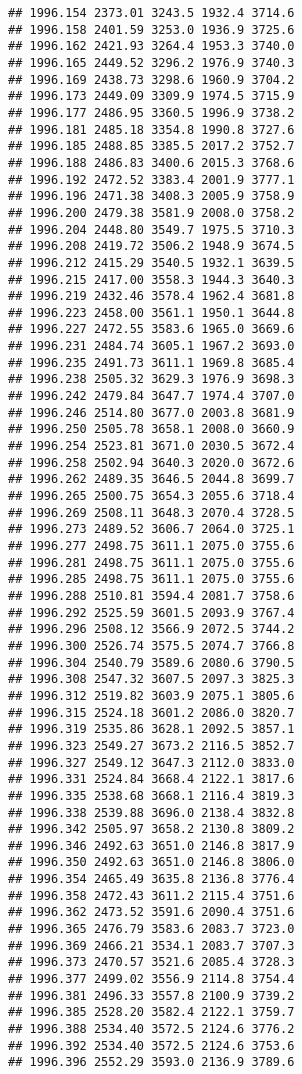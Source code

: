 \documentclass[
]{article}
\begin{document}
\begin{verbatim}
## 1996.154 2373.01 3243.5 1932.4 3714.6
## 1996.158 2401.59 3253.0 1936.9 3725.6
## 1996.162 2421.93 3264.4 1953.3 3740.0
## 1996.165 2449.52 3296.2 1976.9 3740.3
## 1996.169 2438.73 3298.6 1960.9 3704.2
## 1996.173 2449.09 3309.9 1974.5 3715.9
## 1996.177 2486.95 3360.5 1996.9 3738.2
## 1996.181 2485.18 3354.8 1990.8 3727.6
## 1996.185 2488.85 3385.5 2017.2 3752.7
## 1996.188 2486.83 3400.6 2015.3 3768.6
## 1996.192 2472.52 3383.4 2001.9 3777.1
## 1996.196 2471.38 3408.3 2005.9 3758.9
## 1996.200 2479.38 3581.9 2008.0 3758.2
## 1996.204 2448.80 3549.7 1975.5 3710.3
## 1996.208 2419.72 3506.2 1948.9 3674.5
## 1996.212 2415.29 3540.5 1932.1 3639.5
## 1996.215 2417.00 3558.3 1944.3 3640.3
## 1996.219 2432.46 3578.4 1962.4 3681.8
## 1996.223 2458.00 3561.1 1950.1 3644.8
## 1996.227 2472.55 3583.6 1965.0 3669.6
## 1996.231 2484.74 3605.1 1967.2 3693.0
## 1996.235 2491.73 3611.1 1969.8 3685.4
## 1996.238 2505.32 3629.3 1976.9 3698.3
## 1996.242 2479.84 3647.7 1974.4 3707.0
## 1996.246 2514.80 3677.0 2003.8 3681.9
## 1996.250 2505.78 3658.1 2008.0 3660.9
## 1996.254 2523.81 3671.0 2030.5 3672.4
## 1996.258 2502.94 3640.3 2020.0 3672.6
## 1996.262 2489.35 3646.5 2044.8 3699.7
## 1996.265 2500.75 3654.3 2055.6 3718.4
## 1996.269 2508.11 3648.3 2070.4 3728.5
## 1996.273 2489.52 3606.7 2064.0 3725.1
## 1996.277 2498.75 3611.1 2075.0 3755.6
## 1996.281 2498.75 3611.1 2075.0 3755.6
## 1996.285 2498.75 3611.1 2075.0 3755.6
## 1996.288 2510.81 3594.4 2081.7 3758.6
## 1996.292 2525.59 3601.5 2093.9 3767.4
## 1996.296 2508.12 3566.9 2072.5 3744.2
## 1996.300 2526.74 3575.5 2074.7 3766.8
## 1996.304 2540.79 3589.6 2080.6 3790.5
## 1996.308 2547.32 3607.5 2097.3 3825.3
## 1996.312 2519.82 3603.9 2075.1 3805.6
## 1996.315 2524.18 3601.2 2086.0 3820.7
## 1996.319 2535.86 3628.1 2092.5 3857.1
## 1996.323 2549.27 3673.2 2116.5 3852.7
## 1996.327 2549.12 3647.3 2112.0 3833.0
## 1996.331 2524.84 3668.4 2122.1 3817.6
## 1996.335 2538.68 3668.1 2116.4 3819.3
## 1996.338 2539.88 3696.0 2138.4 3832.8
## 1996.342 2505.97 3658.2 2130.8 3809.2
## 1996.346 2492.63 3651.0 2146.8 3817.9
## 1996.350 2492.63 3651.0 2146.8 3806.0
## 1996.354 2465.49 3635.8 2136.8 3776.4
## 1996.358 2472.43 3611.2 2115.4 3751.6
## 1996.362 2473.52 3591.6 2090.4 3751.6
## 1996.365 2476.79 3583.6 2083.7 3723.0
## 1996.369 2466.21 3534.1 2083.7 3707.3
## 1996.373 2470.57 3521.6 2085.4 3728.3
## 1996.377 2499.02 3556.9 2114.8 3754.4
## 1996.381 2496.33 3557.8 2100.9 3739.2
## 1996.385 2528.20 3582.4 2122.1 3759.7
## 1996.388 2534.40 3572.5 2124.6 3776.2
## 1996.392 2534.40 3572.5 2124.6 3753.6
## 1996.396 2552.29 3593.0 2136.9 3789.6

\end{verbatim}
\end{document}
